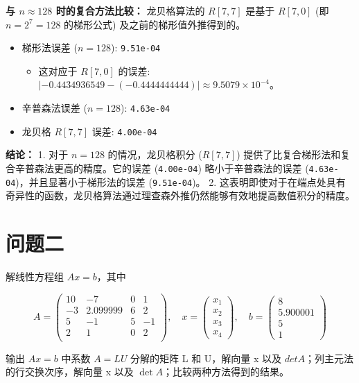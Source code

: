 \documentclass[11pt]{article}
\providecommand{\tightlist}{%
      \setlength{\itemsep}{0pt}\setlength{\parskip}{0pt}}
\begin{document}
\textbf{与 \(n \approx 128\) 时的复合方法比较：} 龙贝格算法的 \(R[7,7]\)
是基于 \(R[7,0]\) (即 \(n=2^7=128\) 的梯形公式)
及之前的梯形值外推得到的。

\begin{itemize}
\tightlist
\item
  梯形法误差 (\(n=128\)): \texttt{9.51e-04}

  \begin{itemize}
  \tightlist
  \item
    这对应于 \(R[7,0]\) 的误差:
    \(|-0.4434936549 - (-0.4444444444)| \approx 9.5079 \times 10^{-4}\)。
  \end{itemize}
\item
  辛普森法误差 (\(n=128\)): \texttt{4.63e-04}
\item
  龙贝格 \(R[7,7]\) 误差: \texttt{4.00e-04}
\end{itemize}

\textbf{结论：} 1. 对于 \(n=128\) 的情况，龙贝格积分 (\(R[7,7]\))
提供了比复合梯形法和复合辛普森法更高的精度。它的误差 (\texttt{4.00e-04})
略小于辛普森法的误差 (\texttt{4.63e-04})，并且显著小于梯形法的误差
(\texttt{9.51e-04})。 2.
这表明即使对于在端点处具有奇异性的函数，龙贝格算法通过理查森外推仍然能够有效地提高数值积分的精度。

    \section{问题二}\label{ux95eeux9898ux4e8c}

解线性方程组 \(A x = b\)，其中

\[
A = \begin{pmatrix}
  10 & -7 & 0 & 1\\
  -3 & 2.099999 & 6 & 2\\
  5 & -1 & 5 & -1\\
  2 & 1 & 0 & 2\\
\end{pmatrix}, \quad 
x = \begin{pmatrix}
  x_1\\ x_2\\ x_3\\ x_4
\end{pmatrix}, \quad
b = \begin{pmatrix}
  8\\ 5.900001\\ 5\\ 1
\end{pmatrix}
\]

输出 \(A x = b\) 中系数 \(A = L U\) 分解的矩阵 L 和 U，解向量 x 以及
\(det A\)；列主元法的行交换次序，解向量 x 以及
\(\det A\)；比较两种方法得到的结果。
\end{document}
